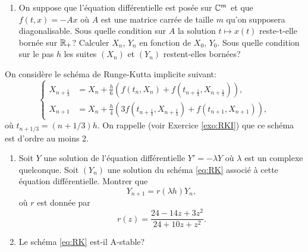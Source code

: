 \documentclass[a4paper,12pt,reqno]{amsart}
\begin{document}
\begin{exo}
\begin{enumerate}
    \item On suppose que l'équation différentielle est posée sur $\mathbb{C}^m$ et que $f(t,x) = -Ax$ où $A$ est une matrice carrée de taille $m$ qu'on supposera diagonalisable. Sous quelle condition sur $A$ la solution $t\mapsto x(t)$ reste-t-elle bornée sur $\mathbb{R}_+$? Calculer $X_n$, $Y_n$ en fonction de $X_0$, $Y_0$. Sous quelle condition sur le pas $h$ les suites $(X_n)$ et $(Y_n)$ restent-elles bornées?
  \end{enumerate}
\end{exo}

\begin{exo}

  On considère le schéma de Runge-Kutta implicite suivant:
  \begin{equation} \label{eq:RK}
    \left\{
      \begin{aligned}
        X_{n+\frac13} &  = X_n + \frac h6\left(f(t_n,X_n) + f(t_{n+\frac13},X_{n+\frac13})\right), \\
        X_{n+1}       &  = X_n + \frac h4\left(3f(t_{n+\frac13},X_{n+\frac13}) + f(t_{n+1},X_{n+1})\right),
      \end{aligned}
    \right.
  \end{equation}
  où $t_{n+1/3} = (n+1/3)h$. On rappelle (voir Exercice \ref{exo:RKI}) que ce schéma est d'ordre au moins 2.
  \begin{enumerate}
    \item Soit $Y$ une solution de l'équation différentielle $Y' = - \lambda Y$ où $\lambda$ est un complexe quelconque. Soit $(Y_n)$ une solution du schéma \eqref{eq:RK} associé à cette équation différentielle. Montrer que
      \[
        Y_{n+1} = r(\lambda h) Y_n,
      \]
    où $r$ est donnée par
      \[
        r(z) = \frac{24 - 14 z + 3 z^2}{24 + 10 z + z^2}.
      \]
    \item Le schéma \eqref{eq:RK} est-il A-stable?
  \end{enumerate}
\end{exo}
\end{document}
